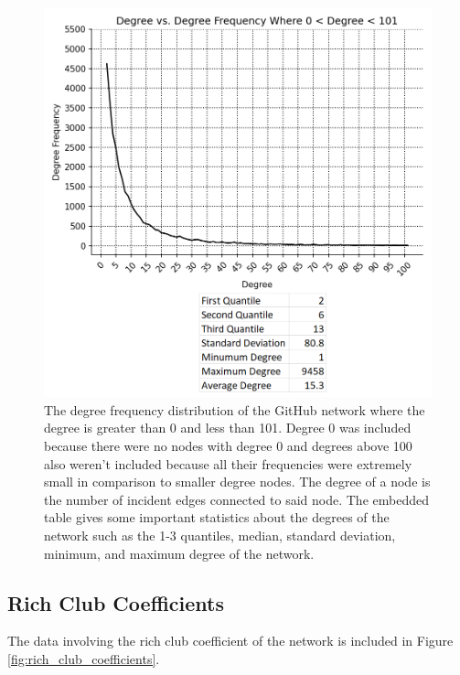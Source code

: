 \documentclass[9pt,twocolumn,twoside]{pnas-new}
\begin{document}
\begin{figure}
\centering
\includegraphics[width=.8\linewidth]{degree_frequencies}
\caption{The degree frequency distribution of the GitHub network where the degree is greater than 0 and less than 101. Degree 0 was included because there were no nodes with degree 0 and degrees above 100 also weren't included because all their frequencies were extremely small in comparison to smaller degree nodes. The degree of a node is the number of incident edges connected to said node. The embedded table gives some important statistics about the degrees of the network such as the 1-3 quantiles, median, standard deviation, minimum, and maximum degree of the network.
}
\label{fig:degree_frequencies}
\end{figure}

\subsection*{Rich Club Coefficients} The data involving the rich club coefficient of the network is included in Figure \ref{fig:rich_club_coefficients}.
\end{document}
